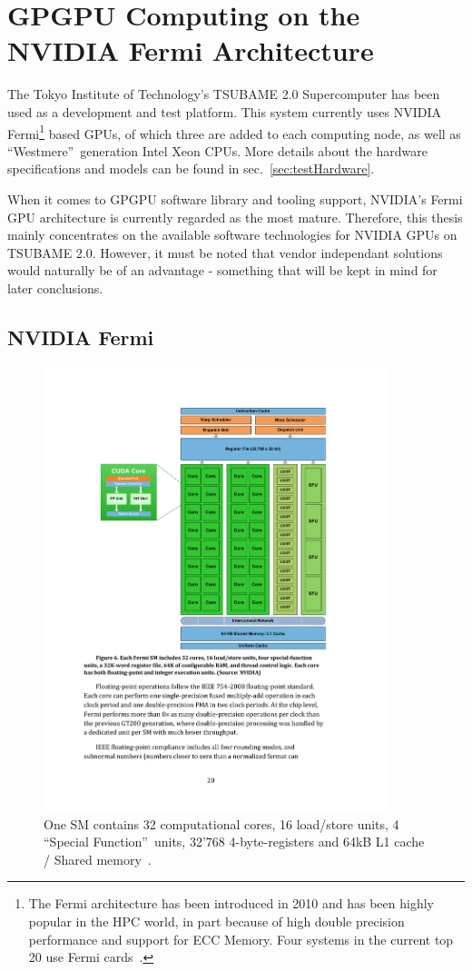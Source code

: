 \clearpage
\section{GPGPU Computing on the NVIDIA Fermi Architecture} \label{sec:fermi}

The Tokyo Institute of Technology's TSUBAME 2.0 Supercomputer has been used as a development and test platform. This system currently uses NVIDIA Fermi\footnote{The Fermi architecture has been introduced in 2010 and has been highly popular in the HPC world, in part because of high double precision performance and support for ECC Memory. Four systems in the current top 20 use Fermi cards~\cite{Top500}.} based GPUs, of which three are added to each computing node, as well as \textquotedblleft Westmere\textquotedblright\ generation Intel Xeon CPUs. More details about the hardware specifications and models can be found in sec.~\ref{sec:testHardware}.

When it comes to GPGPU software library and tooling support, NVIDIA's Fermi GPU architecture is currently regarded as the most mature. Therefore, this thesis mainly concentrates on the available software technologies for NVIDIA GPUs on TSUBAME 2.0. However, it must be noted that vendor independant solutions would naturally be of an advantage - something that will be kept in mind for later conclusions.

\subsection{NVIDIA Fermi} \label{sub:fermi}

\begin{figure}[hbtp]
  \centering  \includegraphics[width=10cm]{figures/FermiOneSM.pdf}
  \caption [Layout of One Streaming Multiprocessor (SM)]{One SM contains 32 computational cores, 16 load/store units, 4 \textquotedblleft Special Function\textquotedblright\ units, 32'768 4-byte-registers and 64kB L1 cache / Shared memory~\cite[p. 8]{FermiWhitepaperOfficial}.}
  \label{figure:fermiOneSM}
\end{figure} 

